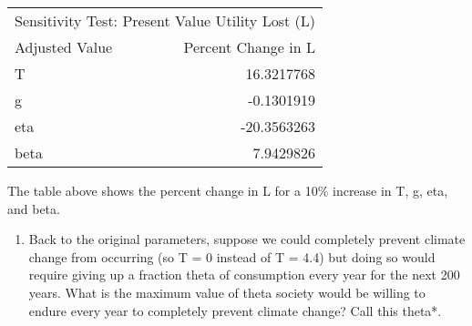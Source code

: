 \documentclass[]{article}
\providecommand{\tightlist}{%
  \setlength{\itemsep}{0pt}\setlength{\parskip}{0pt}}
\begin{document}
\begin{table}[H]
\centering
\begin{tabular}{l|r}
\hline
\multicolumn{2}{c|}{Sensitivity Test: Present Value Utility Lost (L)} \\
\cline{1-2}
Adjusted Value & Percent Change in L\\
\hline
T & 16.3217768\\
\hline
g & -0.1301919\\
\hline
eta & -20.3563263\\
\hline
beta & 7.9429826\\
\hline
\end{tabular}
\end{table}

The table above shows the percent change in L for a 10\% increase in T,
g, eta, and beta.

\begin{enumerate}
\def\labelenumi{(\alph{enumi})}
\setcounter{enumi}{2}
\tightlist
\item
  Back to the original parameters, suppose we could completely prevent
  climate change from occurring (so T = 0 instead of T = 4.4) but doing
  so would require giving up a fraction theta of consumption every year
  for the next 200 years. What is the maximum value of theta society
  would be willing to endure every year to completely prevent climate
  change? Call this theta*.
\end{enumerate}
\end{document}
